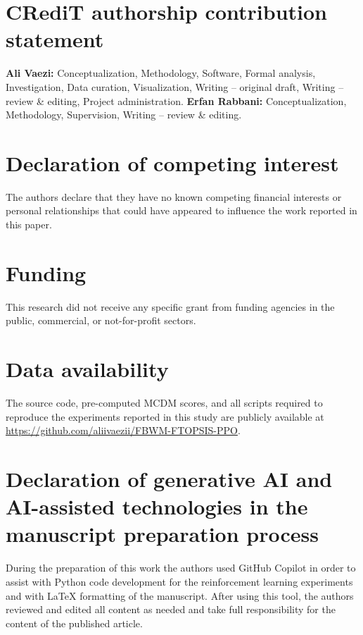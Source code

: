 \documentclass[preprint,12pt]{elsarticle}
\begin{document}

\section*{CRediT authorship contribution statement}

\textbf{Ali Vaezi:} Conceptualization, Methodology, Software, Formal analysis,
Investigation, Data curation, Visualization, Writing -- original draft,
Writing -- review \& editing, Project administration.
\textbf{Erfan Rabbani:} Conceptualization, Methodology, Supervision,
Writing -- review \& editing.

\section*{Declaration of competing interest}

The authors declare that they have no known competing financial interests
or personal relationships that could have appeared to influence the work
reported in this paper.

\section*{Funding}

This research did not receive any specific grant from funding agencies
in the public, commercial, or not-for-profit sectors.

\section*{Data availability}

The source code, pre-computed MCDM scores, and all scripts required to
reproduce the experiments reported in this study are publicly available at
\url{https://github.com/aliivaezii/FBWM-FTOPSIS-PPO}.

\section*{Declaration of generative AI and AI-assisted technologies in the manuscript preparation process}

During the preparation of this work the authors used GitHub Copilot
in order to assist with Python code development for the reinforcement
learning experiments and with \LaTeX{} formatting of the manuscript.
After using this tool, the authors reviewed and edited all content
as needed and take full responsibility for the content of the
published article.
\end{document}
